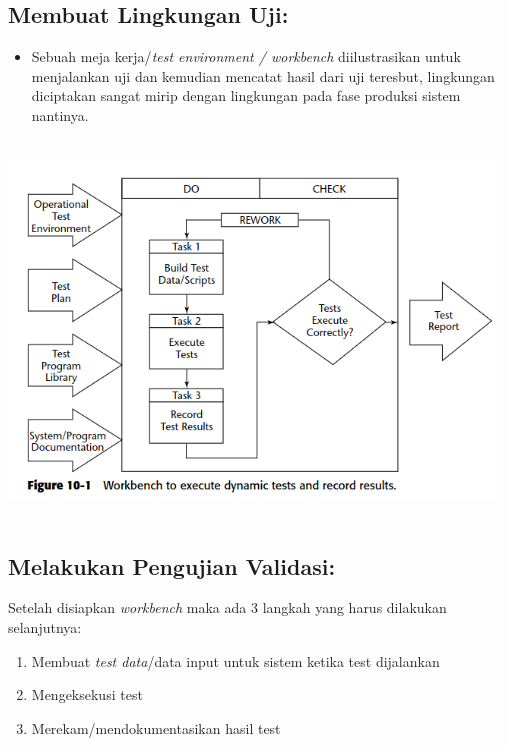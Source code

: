 \documentclass[12pt]{article}
\begin{document}
\subsection*{Membuat Lingkungan Uji:}
\begin{itemize}
   \item Sebuah meja kerja/\emph{test environment / workbench} diilustrasikan untuk menjalankan uji dan kemudian mencatat hasil dari uji teresbut, lingkungan diciptakan  sangat  mirip dengan lingkungan pada fase produksi sistem nantinya.
\end{itemize}
\begin{center}
   \includegraphics[width=13cm, height=10cm]{images/workbench.png}
\end{center}


\subsection*{Melakukan Pengujian Validasi:}


Setelah disiapkan \emph{workbench} maka ada 3 langkah yang harus dilakukan selanjutnya:
\begin{enumerate}
   \item Membuat \emph{test data}/data input untuk sistem ketika test dijalankan
   \item Mengeksekusi test
   \item Merekam/mendokumentasikan hasil test
\end{enumerate}



\end{document}
